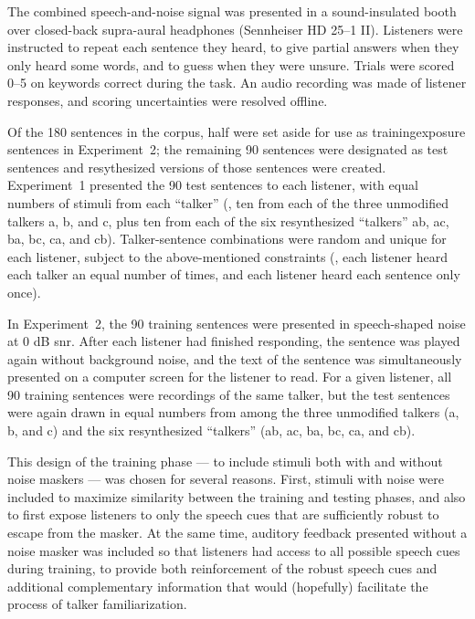 The combined speech-and-noise signal was presented in a sound-insulated booth over closed-back supra-aural headphones (Sennheiser HD 25–1 II).  Listeners were instructed to repeat each sentence they heard, to give partial answers when they only heard some words, and to guess when they were unsure.  Trials were scored 0–5 on keywords correct during the task.  An audio recording was made of listener responses, and scoring uncertainties were resolved offline.  

Of the 180 sentences in the corpus, half were set aside for use as training\slsh{}exposure sentences in Experiment~2; the remaining 90 sentences were designated as test sentences and resythesized versions of those sentences were created.  Experiment~1 presented the 90 test sentences to each listener, with equal numbers of stimuli from each “talker” (\ie, ten from each of the three unmodified talkers \ac{a}, \ac{b}, and \ac{c}, plus ten from each of the six resynthesized “talkers” \ac{ab}, \ac{ac}, \ac{ba}, \ac{bc}, \ac{ca}, and \ac{cb}).  Talker-sentence combinations were random and unique for each listener, subject to the above-mentioned constraints (\ie, each listener heard each talker an equal number of times, and each listener heard each sentence only once).

In Experiment~2, the 90 training sentences were presented in speech-shaped noise at 0 dB \ac{snr}.  After each listener had finished responding, the sentence was played again without background noise, and the text of the sentence was simultaneously presented on a computer screen for the listener to read.  For a given listener, all 90 training sentences were recordings of the same talker, but the test sentences were again drawn in equal numbers from among the three unmodified talkers (\ac{a}, \ac{b}, and \ac{c}) and the six resynthesized “talkers” (\ac{ab}, \ac{ac}, \ac{ba}, \ac{bc}, \ac{ca}, and \ac{cb}).

This design of the training phase — to include stimuli both with and without noise maskers — was chosen for several reasons.  First, stimuli with noise were included to maximize similarity between the training and testing phases, and also to first expose listeners to only the speech cues that are sufficiently robust to escape from the masker.  At the same time, auditory feedback presented without a noise masker was included so that listeners had access to all possible speech cues during training, to provide both reinforcement of the robust speech cues and additional complementary information that would (hopefully) facilitate the process of talker familiarization.

